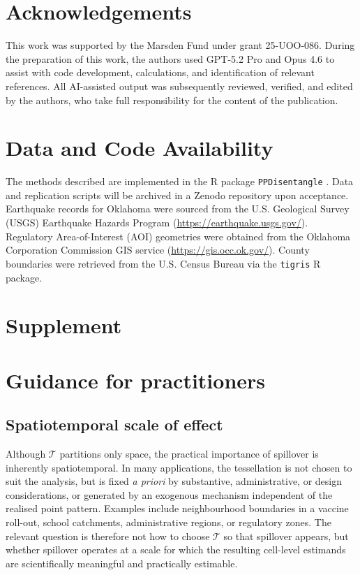 \documentclass{statsoc}
\newcommand{\1}{\mathbbm{1}}
\begin{document}
\section*{Acknowledgements}
This work was supported by the Marsden Fund under grant 25-UOO-086. During the preparation of this work, the authors used GPT-5.2 Pro and Opus 4.6 to assist with code development, calculations, and identification of relevant references. All AI-assisted output was subsequently reviewed, verified, and edited by the authors, who take full responsibility for the content of the publication.

\section{Data and Code Availability}

The methods described are implemented in the R package \texttt{PPDisentangle} \cite{PPDisentangle}. Data and replication scripts will be archived in a Zenodo repository upon acceptance.  Earthquake records for Oklahoma were sourced from the U.S. Geological Survey (USGS) Earthquake Hazards Program (\url{https://earthquake.usgs.gov/}). Regulatory Area-of-Interest (AOI) geometries were obtained from the Oklahoma Corporation Commission GIS service (\url{https://gis.occ.ok.gov/}). County boundaries were retrieved from the U.S. Census Bureau via the \texttt{tigris} R package.

      
 
\newpage


\setcounter{page}{1}
\renewcommand{\thepage}{S\arabic{page}} 
\section*{Supplement}
\setcounter{section}{0}
\renewcommand{\thesection}{S\arabic{section}}

\section{Guidance for practitioners}

\subsection{Spatiotemporal scale of effect}\label{sec:scale-of-effect}
Although \(\mathcal T\) partitions only space, the practical importance of spillover is inherently spatiotemporal. In many applications, the tessellation is not chosen to suit the analysis, but is fixed \textit{a priori} by substantive, administrative, or design considerations, or generated by an exogenous mechanism independent of the realised point pattern. Examples include neighbourhood boundaries in a vaccine roll-out, school catchments, administrative regions, or regulatory zones. The relevant question is therefore not how to choose \(\mathcal T\) so that spillover appears, but whether spillover operates at a scale for which the resulting cell-level estimands are scientifically meaningful and practically estimable.
\end{document}

